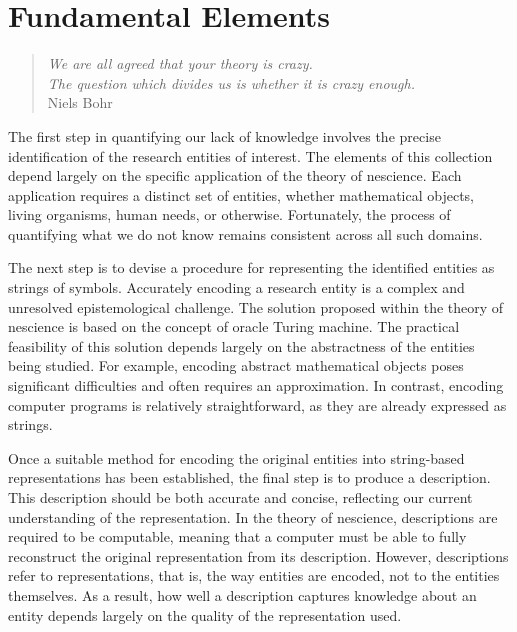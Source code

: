 %
%


\chapter{Fundamental Elements}
\label{cha:Topics-and-Descriptions}

\begin{quote}
\begin{flushright}
\emph{We are all agreed that your theory is crazy. \\
The question which divides us is whether it is crazy enough.} \\
Niels Bohr
\end{flushright}
\end{quote}
\bigskip

The first step in quantifying our lack of knowledge involves the precise identification of the research entities of interest. The elements of this collection depend largely on the specific application of the theory of nescience. Each application requires a distinct set of entities, whether mathematical objects, living organisms, human needs, or otherwise. Fortunately, the process of quantifying what we do not know remains consistent across all such domains.

The next step is to devise a procedure for representing the identified entities as strings of symbols. Accurately encoding a research entity is a complex and unresolved epistemological challenge. The solution proposed within the theory of nescience is based on the concept of oracle Turing machine. The practical feasibility of this solution depends largely on the abstractness of the entities being studied. For example, encoding abstract mathematical objects poses significant difficulties and often requires an approximation. In contrast, encoding computer programs is relatively straightforward, as they are already expressed as strings.

Once a suitable method for encoding the original entities into string-based representations has been established, the final step is to produce a description. This description should be both accurate and concise, reflecting our current understanding of the representation. In the theory of nescience, descriptions are required to be computable, meaning that a computer must be able to fully reconstruct the original representation from its description. However, descriptions refer to representations, that is, the way entities are encoded, not to the entities themselves. As a result, how well a description captures knowledge about an entity depends largely on the quality of the representation used.

